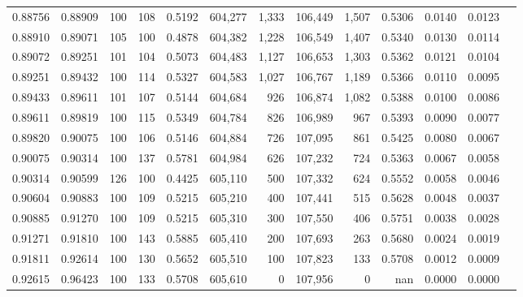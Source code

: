 \begin{tabular}{rrrrrrrrrrrrr}
0.88756 & 0.88909 &   100 & 108 &                                     0.5192 & 604,277 &   1,333 & 106,449 &   1,507 & 0.5306 & 0.0140 & 0.0123 \\
0.88910 & 0.89071 &   105 & 100 &                                     0.4878 & 604,382 &   1,228 & 106,549 &   1,407 & 0.5340 & 0.0130 & 0.0114 \\
0.89072 & 0.89251 &   101 & 104 &                                     0.5073 & 604,483 &   1,127 & 106,653 &   1,303 & 0.5362 & 0.0121 & 0.0104 \\
0.89251 & 0.89432 &   100 & 114 &                                     0.5327 & 604,583 &   1,027 & 106,767 &   1,189 & 0.5366 & 0.0110 & 0.0095 \\
0.89433 & 0.89611 &   101 & 107 &                                     0.5144 & 604,684 &     926 & 106,874 &   1,082 & 0.5388 & 0.0100 & 0.0086 \\
0.89611 & 0.89819 &   100 & 115 &                                     0.5349 & 604,784 &     826 & 106,989 &     967 & 0.5393 & 0.0090 & 0.0077 \\
0.89820 & 0.90075 &   100 & 106 &                                     0.5146 & 604,884 &     726 & 107,095 &     861 & 0.5425 & 0.0080 & 0.0067 \\
0.90075 & 0.90314 &   100 & 137 &                                     0.5781 & 604,984 &     626 & 107,232 &     724 & 0.5363 & 0.0067 & 0.0058 \\
0.90314 & 0.90599 &   126 & 100 &                                     0.4425 & 605,110 &     500 & 107,332 &     624 & 0.5552 & 0.0058 & 0.0046 \\
0.90604 & 0.90883 &   100 & 109 &                                     0.5215 & 605,210 &     400 & 107,441 &     515 & 0.5628 & 0.0048 & 0.0037 \\
0.90885 & 0.91270 &   100 & 109 &                                     0.5215 & 605,310 &     300 & 107,550 &     406 & 0.5751 & 0.0038 & 0.0028 \\
0.91271 & 0.91810 &   100 & 143 &                                     0.5885 & 605,410 &     200 & 107,693 &     263 & 0.5680 & 0.0024 & 0.0019 \\
0.91811 & 0.92614 &   100 & 130 &                                     0.5652 & 605,510 &     100 & 107,823 &     133 & 0.5708 & 0.0012 & 0.0009 \\
0.92615 & 0.96423 &   100 & 133 &                                     0.5708 & 605,610 &       0 & 107,956 &       0 &    nan & 0.0000 & 0.0000 \\
\bottomrule
\end{tabular}
